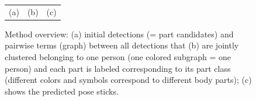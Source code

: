 \begin{figure}
\begin{tabular}{c c c }
  (a) & (b) & (c) \\   
  \end{tabular} 

  \caption{Method overview: (a) initial detections (= part
  candidates) and pairwise terms (graph) 
  between all detections that (b) are jointly clustered belonging to
  one person (one colored subgraph = one person) and each part is labeled
  corresponding to its part class (different colors and symbols
  correspond to different body parts); (c) shows the predicted pose
  sticks.}
 \vspace{-1.0em}
  \label{fig:overview}
\end{figure}

